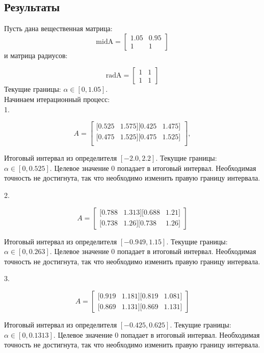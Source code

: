 \documentclass[a4paper,12pt]{article}
\begin{document}
\begin{alignleft}

\section{Результаты}

Пусть дана вещественная матрица:
\[
\text{midA} = \begin{bmatrix}
1.05 & 0.95 \\
1 & 1
\end{bmatrix} \tag{17}
\]
и матрица радиусов:


\[
\text{radA} = \begin{bmatrix}
1 & 1 \\
1 & 1
\end{bmatrix} \tag{18}
\]
Текущие границы: \(\alpha \in [0, 1.05]\).\\

Начинаем итерационный процесс: \\
1. 

\[
A = \begin{bmatrix}
[0.525 & 1.575] 
[0.425 & 1.475]  \\
[0.475 & 1.525] 
[0.475 & 1.525] \\
\end{bmatrix}, \tag{19}
\]

Итоговый интервал из определителя \([-2.0, 2.2]\). Текущие границы: \(\alpha \in [0, 0.525]\). Целевое значение \(0\) попадает в итоговый интервал. Необходимая точность не достигнута, так что необходимо изменить правую границу интервала.

2.

\[
A = \begin{bmatrix}
[0.788 & 1.313]
[0.688 & 1.21] \\
[0.738 & 1.26]
[0.738 & 1.26]
\end{bmatrix} \tag{20}
\]

Итоговый интервал из определителя \([-0.949, 1.15]\). Текущие границы: \(\alpha \in [0, 0.263]\). Целевое значение \(0\) попадает в итоговый интервал. Необходимая точность не достигнута, так что необходимо изменить правую границу интервала.

3.

\[
A = \begin{bmatrix}
[0.919 & 1.181]
[0.819 & 1.081] \\
[0.869 & 1.131]
[0.869 & 1.131]
\end{bmatrix} \tag{21}
\]

Итоговый интервал из определителя \([-0.425, 0.625]\). Текущие границы: \(\alpha \in [0, 0.1313]\). Целевое значение \(0\) попадает в итоговый интервал. Необходимая точность не достигнута, так что необходимо изменить правую границу интервала.


\end{alignleft}
\end{document}
